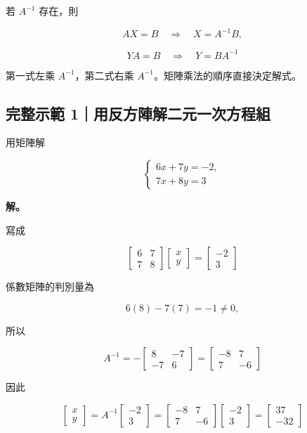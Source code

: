 \documentclass[11pt,a4paper]{article}
\begin{document}
若 \(A^{-1}\) 存在，則

\[
AX=B\quad\Longrightarrow\quad X=A^{-1}B,
\]

\[
YA=B\quad\Longrightarrow\quad Y=BA^{-1}
\]

第一式左乘 \(A^{-1}\)，第二式右乘 \(A^{-1}\)。矩陣乘法的順序直接決定解式。

\subsection{完整示範 1｜用反方陣解二元一次方程組}\label{ux5b8cux6574ux793aux7bc4-1ux7528ux53cdux65b9ux9663ux89e3ux4e8cux5143ux4e00ux6b21ux65b9ux7a0bux7d44}

用矩陣解

\[
\begin{cases}
6x+7y=-2,\\
7x+8y=3
\end{cases}
\]

\textbf{解。}

寫成

\[
\begin{bmatrix}6&7\\7&8\end{bmatrix}
\begin{bmatrix}x\\y\end{bmatrix}
=\begin{bmatrix}-2\\3\end{bmatrix}
\]

係數矩陣的判別量為

\[
6(8)-7(7)=-1\ne0,
\]

所以

\[
A^{-1}
=-\begin{bmatrix}8&-7\\-7&6\end{bmatrix}
=\begin{bmatrix}-8&7\\7&-6\end{bmatrix}
\]

因此

\[
\begin{bmatrix}x\\y\end{bmatrix}
=A^{-1}\begin{bmatrix}-2\\3\end{bmatrix}
=\begin{bmatrix}-8&7\\7&-6\end{bmatrix}
\begin{bmatrix}-2\\3\end{bmatrix}
=\begin{bmatrix}37\\-32\end{bmatrix}
\]
\end{document}

